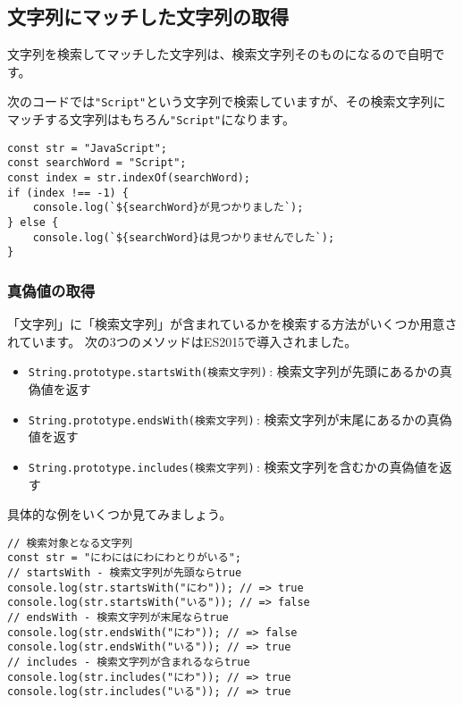 \hypertarget{match-by-string}{%
\subsection{文字列にマッチした文字列の取得}\label{match-by-string}}

文字列を検索してマッチした文字列は、検索文字列そのものになるので自明です。

次のコードでは\texttt{"Script"}という文字列で検索していますが、その検索文字列にマッチする文字列はもちろん\texttt{"Script"}になります。

\begin{lstlisting}
const str = "JavaScript";
const searchWord = "Script";
const index = str.indexOf(searchWord);
if (index !== -1) {
    console.log(`${searchWord}が見つかりました`);
} else {
    console.log(`${searchWord}は見つかりませんでした`);
}
\end{lstlisting}

\hypertarget{test-by-string}{%
\subsubsection{真偽値の取得}\label{test-by-string}}

「文字列」に「検索文字列」が含まれているかを検索する方法がいくつか用意されています。
次の3つのメソッドはES2015で導入されました。

\begin{itemize}
\item
  \texttt{String.prototype.startsWith(検索文字列)}\,\protect{}:
  検索文字列が先頭にあるかの真偽値を返す
\item
  \texttt{String.prototype.endsWith(検索文字列)}\,\protect{}:
  検索文字列が末尾にあるかの真偽値を返す
\item
  \texttt{String.prototype.includes(検索文字列)}\,\protect{}:
  検索文字列を含むかの真偽値を返す
\end{itemize}

具体的な例をいくつか見てみましょう。

\begin{lstlisting}
// 検索対象となる文字列
const str = "にわにはにわにわとりがいる";
// startsWith - 検索文字列が先頭ならtrue
console.log(str.startsWith("にわ")); // => true
console.log(str.startsWith("いる")); // => false
// endsWith - 検索文字列が末尾ならtrue
console.log(str.endsWith("にわ")); // => false
console.log(str.endsWith("いる")); // => true
// includes - 検索文字列が含まれるならtrue
console.log(str.includes("にわ")); // => true
console.log(str.includes("いる")); // => true
\end{lstlisting}

